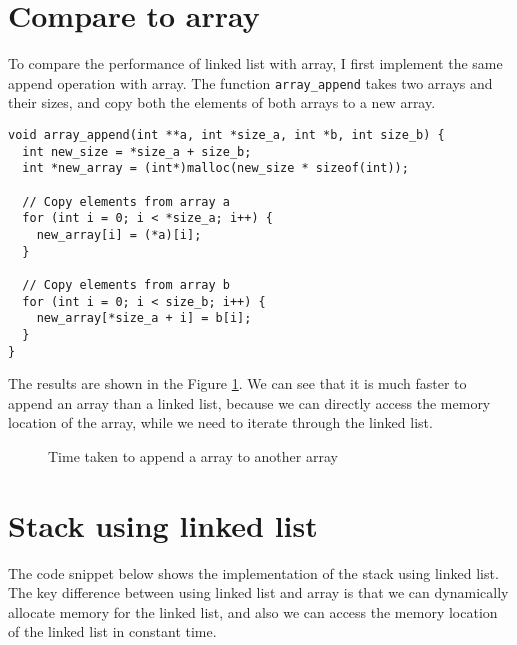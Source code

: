 \documentclass[a4paper,11pt]{article}
\begin{document}
\section*{Compare to array}

To compare the performance of linked list with array, I first implement the same append operation with array.
The function {\tt array\_append} takes two arrays and their sizes, and copy both the elements of both arrays to a new array.

\begin{verbatim}
void array_append(int **a, int *size_a, int *b, int size_b) {
  int new_size = *size_a + size_b;
  int *new_array = (int*)malloc(new_size * sizeof(int));
  
  // Copy elements from array a
  for (int i = 0; i < *size_a; i++) {
    new_array[i] = (*a)[i];
  }
  
  // Copy elements from array b
  for (int i = 0; i < size_b; i++) {
    new_array[*size_a + i] = b[i];
  }
}
\end{verbatim}

The results are shown in the Figure \ref{fig:append_array}. We can see that it is much faster to append an array
than a linked list, because we can directly access the memory location of the array, while we need to iterate through the linked list.

\begin{figure}[H]
  \centering
  \caption{Time taken to append a array to another array}
  \label{fig:append_array}
\end{figure}          

\section*{Stack using linked list}

The code snippet below shows the implementation of the stack using linked list. The key difference
between using linked list and array is that we can dynamically allocate memory for the linked list, and
also we can access the memory location of the linked list in constant time.
\end{document}
